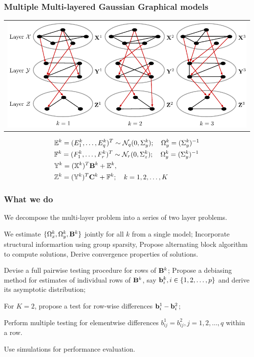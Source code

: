 \documentclass[10pt]{beamer}
\theoremstyle{definition}
\begin{document}
\begin{frame}
\frametitle{Multiple Multi-layered Gaussian Graphical models}

\begin{tabular}{c}
\includegraphics[width=.9\textwidth]{multi2layer}
\end{tabular}

%
\begin{align*}
& {\mathbb{E}}^k = (E_1^k, \ldots, E_q^k)^T \sim {\cal{N}}_q (0, \Sigma_y^k); \quad
\Omega_y^k = (\Sigma_y^k)^{-1}\\
& {\mathbb{F}}^k = (F_1^k, \ldots, F_r^k)^T \sim {\cal{N}}_r (0, \Sigma_z^k); \quad
\Omega_y^k = (\Sigma_y^k)^{-1}\\
& {\mathbb{Y}}^k = ({\mathbb{X}}^k)^T {\mathbf{B}}^k + {\mathbb{E}}^k,\\
& {\mathbb{Z}}^k = ({\mathbb{Y}}^k)^T {\mathbf{C}}^k + {\mathbb{F}}^k; \quad k = 1, 2, \ldots, K
\end{align*}
%

\end{frame}

\begin{frame} %
\frametitle{What we do}

\begin{outline}
\1 We decompose the multi-layer problem into a series of two layer problems.

\vspace{1em}
\1 We estimate $\{ \Omega_x^k, \Omega_y^k, {\mathbf{B}}^k \}$ jointly for all $k$ from a single model;
\2 Incorporate structural informartion using group sparsity,
\2 Propose alternating block algorithm to compute solutions,
\2 Derive convergence properties of solutions.

\vspace{1em}
\1 Devise a full pairwise testing procedure for rows of ${\mathbf{B}}^k$;
\2 Propose a debiasing method for estimates of individual rows of ${\mathbf{B}}^k$, say ${\bf{b}}_i^k, i \in \{ 1, 2, \ldots, p \}$ and derive its asymptotic distribution;

\2 For $K=2$, propose a test for row-wise differences ${\bf{b}}_i^1 - {\bf{b}}_i^2$;

\2 Perform multiple testing for elementwise differences $b_{ij}^1 = b_{ij}^2, j = 1, 2, \ldots, q$ within a row.

\vspace{1em}
\1 Use simulations for performance evaluation.
\end{outline}
\end{frame}
\end{document}
